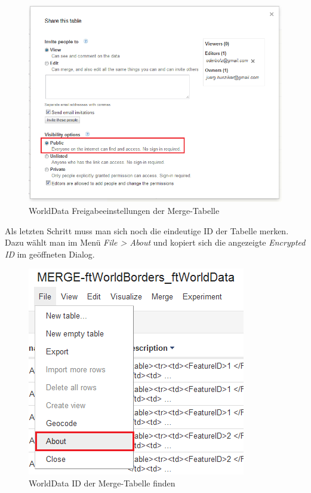 \begin{figure}[!h]
	\centering
	\includegraphics[scale=0.5]{images/usecase1-worlddata/documentation/worlddata-prepare_fusiontableslayer2.png}
	\caption{WorldData Freigabeeinstellungen der Merge-Tabelle}
	\label{worlddata-prepare_fusiontableslayer2}
\end{figure}

Als letzten Schritt muss man sich noch die eindeutige ID der Tabelle merken. Dazu wählt man im Menü  \emph{File > About} und kopiert sich die angezeigte \emph{Encrypted ID} im geöffneten Dialog.

\begin{figure}[!h]
	\centering
	\includegraphics{images/usecase1-worlddata/documentation/worlddata-prepare_fusiontableslayer3.png}
	\caption{WorldData ID der Merge-Tabelle finden}
	\label{worlddata-prepare_fusiontableslayer3}
\end{figure}

